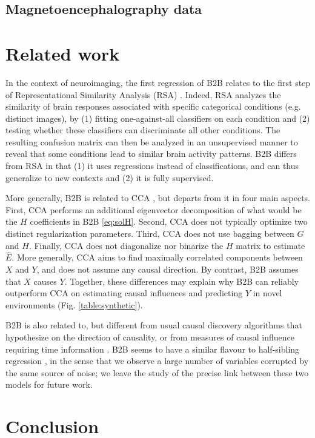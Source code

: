 \documentclass{article}
\begin{document}


\subsection{Magnetoencephalography data}
\label{sec:experiment_real}



\section{Related work}

In the context of neuroimaging, the first regression of B2B relates to the first step of Representational Similarity Analysis (RSA) \citep{kriegeskorte2008representational}. Indeed, RSA analyzes the similarity of brain responses associated with specific categorical conditions (e.g. distinct images), by (1) fitting one-against-all classifiers on each condition and (2) testing whether these classifiers can discriminate all other conditions. The resulting confusion matrix can then be analyzed in an unsupervised manner to reveal that some conditions lead to similar brain activity patterns. B2B differs from RSA in that (1) it uses regressions instead of classifications, and can thus generalize to new contexts and (2)
it is fully supervised.

More generally, B2B is related to CCA \citep{cca_hotelling}, but departs from it in four main aspects. First, CCA performs an additional eigenvector decomposition of what would be the $H$ coefficients in B2B \eqref{eq:solH}. Second, CCA does not typically optimize two distinct regularization parameters. Third, CCA does not use bagging between $G$ and $H$. Finally, CCA does not diagonalize nor binarize the $H$ matrix to estimate $\hat E$. More generally, CCA aims to find maximally correlated components between $X$ and $Y$, and does not assume any causal direction. By contrast, B2B assumes that $X$ causes $Y$. Together, these differences may explain why B2B can reliably outperform CCA on estimating causal influences and predicting $Y$ in novel environments (Fig. \ref{table:synthetic}).

B2B is also related to, but different from usual causal discovery algorithms \citep{peters2017elements} that hypothesize on the direction of causality, or from measures of causal influence requiring time information \citep{granger1969investigating, janzing2013quantifying}.
%
B2B seems to have a similar flavour to half-sibling regression \citep{scholkopf2016modeling}, in the sense that we observe a large number of variables corrupted by the same source of noise; we leave the study of the precise link between these two models for future work.


\section{Conclusion}


\clearpage
\newpage




% 

%
\end{document}
